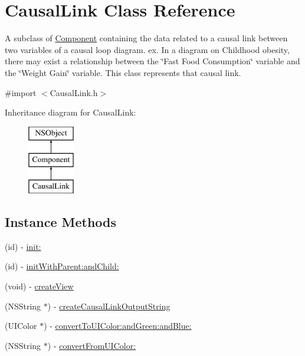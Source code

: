\hypertarget{interface_causal_link}{\section{Causal\-Link Class Reference}
\label{interface_causal_link}
}


A subclass of \hyperlink{interface_component}{Component} containing the data related to a causal link between two variables of a causal loop diagram. ex. In a diagram on Childhood obesity, there may exist a relationship between the \char`\"{}\-Fast Food Consumption\char`\"{} variable and the \char`\"{}\-Weight Gain\char`\"{} variable. This class represents that causal link.  




{\ttfamily \#import $<$Causal\-Link.\-h$>$}

Inheritance diagram for Causal\-Link\-:\begin{figure}[H]
\begin{center}
\leavevmode
\includegraphics[height=3.000000cm]{interface_causal_link}
\end{center}
\end{figure}
\subsection*{Instance Methods}
\begin{DoxyCompactItemize}
\item 
(id) -\/ \hyperlink{interface_causal_link_ae3fdc3a923d3d3be4b4aeb821cb90734}{init\-:}
\item 
(id) -\/ \hyperlink{interface_causal_link_a80971dff11e8048c269097f9e94279fc}{init\-With\-Parent\-:and\-Child\-:}
\item 
(void) -\/ \hyperlink{interface_causal_link_ae6b612c2817771b1fd4d12b1b0ac56d3}{create\-View}
\item 
(N\-S\-String $\ast$) -\/ \hyperlink{interface_causal_link_aeaeca5d45f4b917997bfea36c86dc4b1}{create\-Causal\-Link\-Output\-String}
\item 
(U\-I\-Color $\ast$) -\/ \hyperlink{interface_causal_link_a81afff0a3a22627c88301943c5228a6a}{convert\-To\-U\-I\-Color\-:and\-Green\-:and\-Blue\-:}
\item 
(N\-S\-String $\ast$) -\/ \hyperlink{interface_causal_link_acdb5a57ca0f4f77aee198dff20a2ea57}{convert\-From\-U\-I\-Color\-:}
\end{DoxyCompactItemize}
